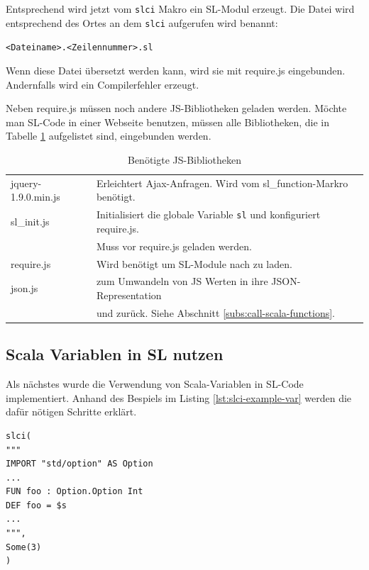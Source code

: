 \documentclass[12pt]{scrreprt}
\begin{document}
Entsprechend wird jetzt vom \lstinline!slci! Makro ein \ac{SL}-Modul erzeugt. Die Datei wird entsprechend des Ortes an dem \lstinline!slci! aufgerufen wird benannt:
\begin{center}
\lstinline!<Dateiname>.<Zeilennummer>.sl!
\end{center}
Wenn diese Datei übersetzt werden kann, wird sie mit require.js eingebunden. Andernfalls wird ein Compilerfehler erzeugt. 

Neben require.js müssen noch andere \ac{JS}-Bibliotheken geladen werden. Möchte man \ac{SL}-Code in einer Webseite benutzen, müssen alle Bibliotheken, die in Tabelle \ref{tab:js-libraries} aufgelistet sind, eingebunden werden.

\begin{table}[h]
\caption{Benötigte \ac{JS}-Bibliotheken}
\centering
\begin{tabular}{ll}
jquery-1.9.0.min.js & Erleichtert Ajax-Anfragen. Wird vom sl\_function-Markro benötigt.\\
sl\_init.js         & Initialisiert die globale Variable \lstinline!sl! und konfiguriert require.js. \\
                    & Muss vor require.js geladen werden.\\
require.js          & Wird benötigt um \ac{SL}-Module nach zu laden.\\
json.js             & zum Umwandeln von JS Werten in ihre JSON-Representation \\
                    & und zurück. Siehe Abschnitt \ref{subs:call-scala-functions}.\\
\end{tabular}
\label{tab:js-libraries}
\end{table}

\subsection{Scala Variablen in SL nutzen}

Als nächstes wurde die Verwendung von Scala-Variablen in \ac{SL}-Code implementiert. Anhand des Bespiels im Listing \ref{lst:slci-example-var} werden die dafür nötigen Schritte erklärt.

\begin{lstlisting}[caption={Beispielaufruf des slci Macros mit Scala Variablen}, label=lst:slci-example-var, float=h]
slci(
"""
IMPORT "std/option" AS Option 
...
FUN foo : Option.Option Int
DEF foo = $s
...
""",
Some(3)
)
\end{lstlisting}
\end{document}
